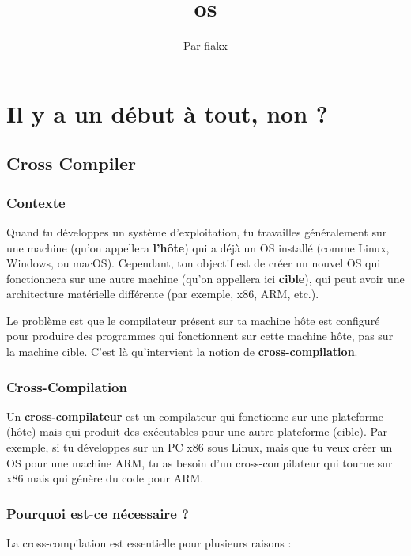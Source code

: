 \documentclass{article}
\title{\Huge os}
\author{\small Par fiakx}
\date{}
\begin{document}
\maketitle

\section{Il y a un début à tout, non ?}

\subsection{Cross Compiler}

\subsubsection{Contexte}
Quand tu développes un système d'exploitation, tu travailles généralement sur une machine (qu'on appellera \textbf{l'hôte}) qui a déjà un OS installé (comme Linux, Windows, ou macOS). Cependant, ton objectif est de créer un nouvel OS qui fonctionnera sur une autre machine (qu'on appellera ici \textbf{cible}), qui peut avoir une architecture matérielle différente (par exemple, x86, ARM, etc.).

Le problème est que le compilateur présent sur ta machine hôte est configuré pour produire des programmes qui fonctionnent sur cette machine hôte, pas sur la machine cible. C'est là qu'intervient la notion de \textbf{cross-compilation}.

\subsubsection{Cross-Compilation}
Un \textbf{cross-compilateur} est un compilateur qui fonctionne sur une plateforme (hôte) mais qui produit des exécutables pour une autre plateforme (cible). Par exemple, si tu développes sur un PC x86 sous Linux, mais que tu veux créer un OS pour une machine ARM, tu as besoin d'un cross-compilateur qui tourne sur x86 mais qui génère du code pour ARM.

\subsubsection{Pourquoi est-ce nécessaire ?}
La cross-compilation est essentielle pour plusieurs raisons :
\end{document}
